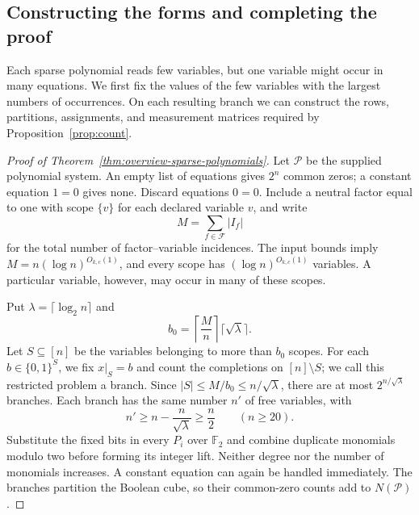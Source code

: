 \subsection{Constructing the forms and completing the proof}\label{subsec:sparse-queries}
Each sparse polynomial reads few variables, but one variable might
occur in many equations. We first fix the values of the few variables
with the largest numbers of occurrences. On each resulting branch we
can construct the rows, partitions, assignments, and measurement matrices required by Proposition~\ref{prop:count}.

\begin{proof}[Proof of Theorem~\ref{thm:overview-sparse-polynomials}]
Let $\mathcal P$ be the supplied polynomial system. An empty list of
equations gives $2^n$ common zeros; a constant equation $1=0$ gives
none. Discard equations $0=0$. Include a neutral factor equal to one
with scope $\{v\}$ for each declared variable $v$, and write
\[
 M=\sum_{f\in\mathcal F}|I_f|
\]
for the total number of factor--variable incidences. The input
bounds imply $M=n(\log n)^{O_{k,c}(1)}$, and every scope has
$(\log n)^{O_{k,c}(1)}$ variables. A particular variable, however,
may occur in many of these scopes.

Put $\lambda=\lceil\log_2 n\rceil$ and
\[
 b_0=\left\lceil\frac Mn\right\rceil\lceil\sqrt\lambda\rceil.
\]
Let $S\subseteq[n]$ be the variables belonging to more than $b_0$
scopes. For each $b\in\{0,1\}^S$, we fix $x|_S=b$ and count the
completions on $[n]\setminus S$; we call this restricted problem a
branch. Since $|S|\le M/b_0\le n/\sqrt\lambda$, there are at most
$2^{n/\sqrt\lambda}$ branches.
Each branch has the same number $n'$ of free variables, with
\[
 n'\ge n-\frac n{\sqrt\lambda}\ge\frac n2
 \qquad(n\ge20).
\]
Substitute the fixed bits in every $P_i$ over $\mathbb F_2$ and
combine duplicate monomials modulo two before forming its integer
lift. Neither degree nor the number of monomials increases. A constant
equation can again be handled immediately. The branches partition the
Boolean cube, so their common-zero counts add to $N(\mathcal P)$.


\end{proof}
